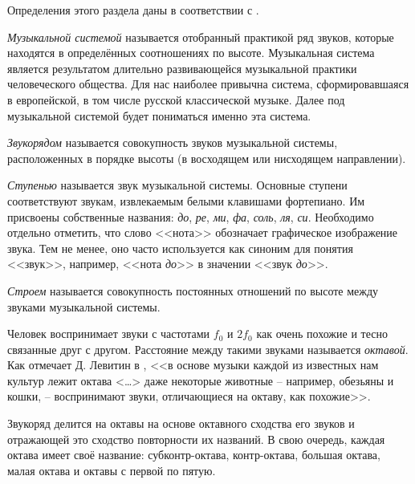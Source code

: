 Определения этого раздела даны в соответствии с \cite{Sposobin2012}.

\emph{Музыкальной системой} называется отобранный практикой ряд звуков, которые
находятся в определённых соотношениях по высоте. Музыкальная система является
результатом длительно развивающейся музыкальной практики человеческого общества.
Для нас наиболее привычна система, сформировавшаяся в европейской, в том числе
русской классической музыке. Далее под музыкальной системой будет пониматься
именно эта система.

\emph{Звукорядом} называется совокупность звуков музыкальной системы,
расположенных в порядке высоты (в восходящем или нисходящем направлении).

\emph{Ступенью} называется звук музыкальной системы. Основные ступени
соответствуют звукам, извлекаемым белыми клавишами фортепиано. Им присвоены
собственные названия: \emph{до}, \emph{ре}, \emph{ми}, \emph{фа}, \emph{соль},
\emph{ля}, \emph{си}. Необходимо отдельно отметить, что слово <<нота>>
обозначает графическое изображение звука. Тем не менее, оно часто используется
как синоним для понятия <<звук>>, например, <<нота \emph{до}>> в значении
<<звук \emph{до}>>.

\emph{Строем} называется совокупность постоянных отношений по высоте между
звуками музыкальной системы.

Человек воспринимает звуки с частотами $f_0$ и $2f_0$ как очень похожие и тесно
связанные друг с другом. Расстояние между такими звуками называется
\emph{октавой}. Как отмечает Д. Левитин в \cite{Levitin2006}, <<в основе
музыки каждой из известных нам культур лежит октава <\ldots> даже некоторые
животные -- например, обезьяны и кошки, -- воспринимают звуки, отличающиеся
на октаву, как похожие>>.

Звукоряд делится на октавы на основе октавного сходства его звуков и отражающей
это сходство повторности их названий. В свою очередь, каждая октава имеет своё
название: субконтр-октава, контр-октава, большая октава, малая октава и октавы с
первой по пятую.


